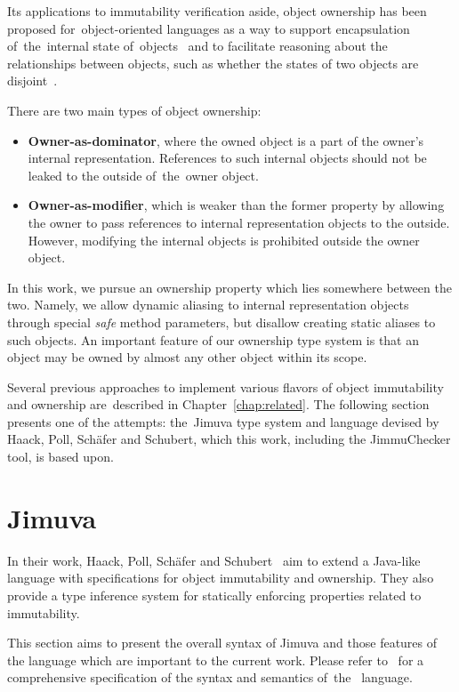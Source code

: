 \documentclass{pracamgr}
\theoremstyle{break}
\theoremstyle{break}
\theoremstyle{break}
\begin{document}
Its applications to immutability verification aside, object ownership
has been proposed for~object-oriented languages as a way to support
encapsulation of~the~internal state of~objects~\cite{own-encap} and to
facilitate reasoning about the relationships between objects, such as
whether the states of two objects are disjoint~\cite{disjointness}.

There are two main types of object ownership:
\begin{itemize}
\item \textbf{Owner-as-dominator}, where the owned object is a part of
  the owner's internal representation. References to such internal
  objects should not be leaked to the outside of~the~owner object. 
\item \textbf{Owner-as-modifier}, which is weaker than the former
  property by allowing the owner to pass references to internal
  representation objects to the outside. However, modifying the
  internal objects is prohibited outside the owner object. 
\end{itemize}
In this work, we pursue an ownership property which lies somewhere
between the two. Namely, we allow dynamic aliasing to internal
representation objects through special \emph{safe} method parameters,
but disallow creating static aliases to such objects. An important
feature of our ownership type system is that an object may be owned by
almost any other object within its scope.

Several previous approaches to implement various flavors of object
immutability and ownership are~described in
Chapter~\ref{chap:related}. The following section presents one of the
attempts: the~Jimuva type system and language devised by Haack, Poll,
Schäfer and Schubert, which this work, including the JimmuChecker
tool, is based upon.

\section{Jimuva}
\label{sec:jimuva}

In their work, Haack, Poll, Schäfer and Schubert~\cite{haack} aim to
extend a Java-like language with specifications for object
immutability and ownership. They also provide a type inference system
for statically enforcing properties related to immutability.

This section aims to present the overall syntax of Jimuva and those
features of the language which are important to the current
work. Please refer to~\cite{haack} for a comprehensive specification
of the syntax and semantics of~the~ language.
\end{document}
